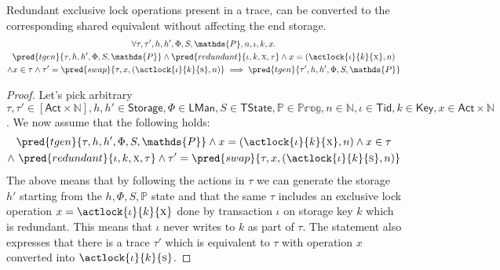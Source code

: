 \begin{lem}
	\label{lem:lockRedundant}
	Redundant exclusive lock operations present in a trace, can be converted to the corresponding shared equivalent without affecting the end storage.
	\begin{gather*}
		\forall \tau, \tau', h, h', \Phi, S, \mathds{P}, n, \iota, k, x \ldotp
			\\
		\pred{tgen}{\tau, h, h', \Phi, S, \mathds{P}} \land \pred{redundant}{\iota, k, \textsc{x}, \tau} \land x = (\actlock{\iota}{k}{\textsc{x}}, n)
		\\ \land x \in \tau
		\land \tau' = \pred{swap}{\tau, x, (\actlock{\iota}{k}{\textsc{s}}, n)}
			\implies
		\pred{tgen}{\tau', h, h', \Phi, S, \mathds{P}}
	\end{gather*}
	\begin{proof}
	Let's pick arbitrary $\tau, \tau' \in [\mathsf{Act} \times \mathds{N}], h, h' \in \mathsf{Storage}, \Phi \in \mathsf{LMan}, S \in \mathsf{TState}, \mathds{P} \in \mathds{Prog}, n \in \mathds{N}, \iota \in \mathsf{Tid}, k \in \mathsf{Key}, x \in \mathsf{Act} \times \mathds{N}$. We now assume that the following holds:
	\begin{gather}
		\label{lem:lockRedundant1}
		\pred{tgen}{\tau, h, h', \Phi, S, \mathds{P}}
		\land x = (\actlock{\iota}{k}{\textsc{x}}, n)
		\land x \in \tau \\
		\label{lem:lockRedundant2}
		\land\ \pred{redundant}{\iota, k, \textsc{x}, \tau}
		\land \tau' = \pred{swap}{\tau, x, (\actlock{\iota}{k}{\textsc{s}}, n)}
	\end{gather}
	The above means that by following the actions in $\tau$ we can generate the storage $h'$ starting from the $h, \Phi, S, \mathds{P}$ state and that the same $\tau$ includes an exclusive lock operation $x = \actlock{\iota}{k}{\textsc{x}}$ done by transaction $\iota$ on storage key $k$ which is redundant. This means that $\iota$ never writes to $k$ as part of $\tau$. The statement also expresses that there is a trace $\tau'$ which is equivalent to $\tau$ with operation $x$ converted into $\actlock{\iota}{k}{\textsc{s}}$.
	

\end{proof}
\end{lem}
